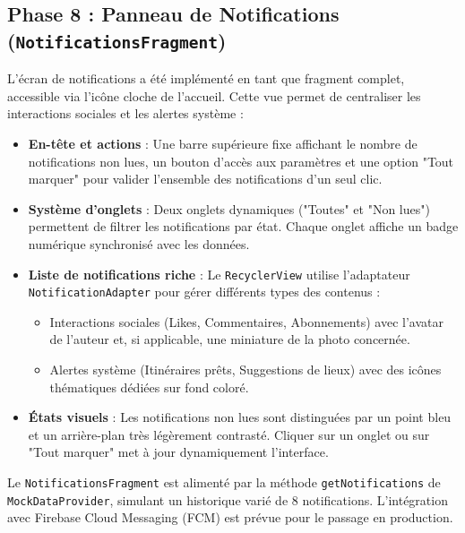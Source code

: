\documentclass{article}
\begin{document}
\subsection{Phase 8 : Panneau de Notifications (\texttt{NotificationsFragment})}
L'écran de notifications a été implémenté en tant que fragment complet, accessible via l'icône cloche de l'accueil. Cette vue permet de centraliser les interactions sociales et les alertes système :
\begin{itemize}
    \item \textbf{En-tête et actions} : Une barre supérieure fixe affichant le nombre de notifications non lues, un bouton d'accès aux paramètres et une option "Tout marquer" pour valider l'ensemble des notifications d'un seul clic.
    \item \textbf{Système d'onglets} : Deux onglets dynamiques ("Toutes" et "Non lues") permettent de filtrer les notifications par état. Chaque onglet affiche un badge numérique synchronisé avec les données.
    \item \textbf{Liste de notifications riche} : Le \texttt{RecyclerView} utilise l'adaptateur \texttt{NotificationAdapter} pour gérer différents types des contenus :
    \begin{itemize}
        \item Interactions sociales (Likes, Commentaires, Abonnements) avec l'avatar de l'auteur et, si applicable, une miniature de la photo concernée.
        \item Alertes système (Itinéraires prêts, Suggestions de lieux) avec des icônes thématiques dédiées sur fond coloré.
    \end{itemize}
    \item \textbf{États visuels} : Les notifications non lues sont distinguées par un point bleu et un arrière-plan très légèrement contrasté. Cliquer sur un onglet ou sur "Tout marquer" met à jour dynamiquement l'interface.
\end{itemize}
Le \texttt{NotificationsFragment} est alimenté par la méthode \texttt{getNotifications} de \texttt{MockDataProvider}, simulant un historique varié de 8 notifications. L'intégration avec Firebase Cloud Messaging (FCM) est prévue pour le passage en production.
\end{document}

